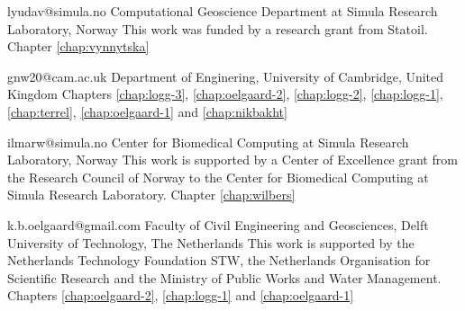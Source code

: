              {lyudav@simula.no}
             {Computational Geoscience Department at Simula Research Laboratory, Norway}
             {This work was funded by a research grant from Statoil.}
             {Chapter \ref{chap:vynnytska}}

             {gnw20@cam.ac.uk}
             {Department of Enginering, University of Cambridge, United Kingdom}
             {}
             {Chapters
              \ref{chap:logg-3},
              \ref{chap:oelgaard-2},
              \ref{chap:logg-2},
              \ref{chap:logg-1},
              \ref{chap:terrel},
              \ref{chap:oelgaard-1} and
              \ref{chap:nikbakht}}

             {ilmarw@simula.no}
             {Center for Biomedical Computing at Simula Research Laboratory, Norway}
             {This work is supported by a Center of Excellence grant
              from the Research Council of Norway to the Center for
              Biomedical Computing at Simula Research Laboratory.}
             {Chapter \ref{chap:wilbers}}

             {k.b.oelgaard@gmail.com}
             {Faculty of Civil Engineering and Geosciences,
              Delft University of Technology, The Netherlands}
             {This work is supported by the Netherlands Technology Foundation
              STW, the Netherlands Organisation for Scientific Research and the
              Ministry of Public Works and Water Management.}
             {Chapters
              \ref{chap:oelgaard-2},
              \ref{chap:logg-1} and
              \ref{chap:oelgaard-1}}
